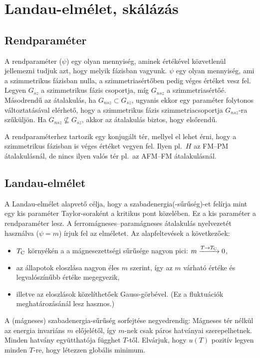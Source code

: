\chapter{Landau-elm\'elet, sk\'al\'az\'as} 
  
 
 \section{Rendparaméter}
   
  A rendparaméter ($\psi$) egy olyan mennyiség, aminek értékével közvetlenül jellemezni tudjuk azt, hogy melyik fázisban vagyunk. $\psi$ egy olyan mennyiség, ami a szimmetrikus fázisban nulla, a szimmetriasértőben pedig véges értéket vesz fel. Legyen $G_{sz}$ a szimmetrikus fázis csoportja, míg $G_{nsz}$ a szimmetriasértőé. Másodrendű az átalakulás, ha $G_{nsz}\subset G_{sz}$, ugyanis ekkor egy paraméter folytonos változtatásával elérhető, hogy a szimmetrikus fázis szimmetriacsoportja $G_{nsz}$-ra szűküljön. Ha $G_{nsz}\nsubseteq G_{sz}$, akkor az átalakulás biztos, hogy elsőrendű.
  
  A rendparaméterhez tartozik egy konjugált tér, mellyel el lehet érni, hogy a szimmetrikus fázisban is véges értéket vegyen fel. Ilyen pl.\ $H$ az FM--PM átalakulásnál, de nincs ilyen valós tér pl.\ az AFM--FM átalakulásnál. 
 
 \section{Landau-elmélet}
 
  A Landau-elmélet alapvető célja, hogy a szabadenergia(-sűrűség)-et felírja mint egy kis paraméter Taylor-soraként a kritikus pont közelében. Ez a kis paraméter a rendparaméter lesz. A ferromágneses--paramágneses átalakulás nyelvezetét használva ($\psi=m$) írjuk fel az elméletet. Az alapfeltevések a következőek:
  \begin{itemize}
   \item $T_\text{C}$ környékén a a mágnesezettségi sűrűsége nagyon pici: $m\xrightarrow{T\to T_\text{C}}0$,
   \item az állapotok eloszlása nagyon éles $m$ szerint, így az $m$ várható értéke és legvalószínűbb értéke megegyezik,
   \item illetve az eloszlások közelíthetőek Gauss-görbével. (Ez a fluktuációk meghatározásánál lesz hasznos.)
  \end{itemize}
  
  A (mágneses) szabadenergia-sűrűség sorfejtése negyedrendig:
  Mágneses tér nélkül az energia invariáns $m$ előjelétől, így $m$-nek csak páros hatványai szerepelhetnek. Minden hatvány együtthatója függhet $T$-től. Elvárjuk, hogy $u(T)$ pozitív legyen minden $T$-re, hogy létezzen globális minimum. 
  
